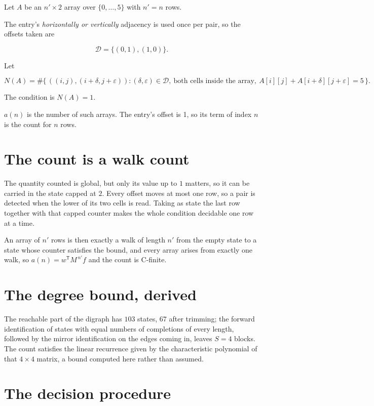 \documentclass[11pt]{article}
\theoremstyle{definition}
\begin{document}
Let $A$ be an $n' \times 2$ array over $\{0,\dots,5\}$ with $n' = n$ rows.

The entry's {\itshape horizontally or vertically} adjacency is used once per pair, so the offsets taken are

\[\mathcal{D} = \{(0,1), (1,0)\}.\]

Let

\[N(A) = \#\bigl\{\,((i,j),(i{+}\delta,j{+}\varepsilon)) : (\delta,\varepsilon) \in \mathcal{D},\ \text{both cells inside the array},\ A[i][j] + A[i{+}\delta][j{+}\varepsilon] = 5\,\bigr\}.\]

The condition is $N(A) = 1$.

$a(n)$ is the number of such arrays. The entry's offset is 1, so its term of index $n$ is the count for $n$ rows.

\section{The count is a walk count}

The quantity counted is global, but only its value up to $1$ matters, so it can be carried in the state capped at $2$. Every offset moves at most one row, so a pair is detected when the lower of its two cells is read. Taking as state the last row together with that capped counter makes the whole condition decidable one row at a time.

An array of $n'$ rows is then exactly a walk of length $n'$ from the empty state to a state whose counter satisfies the bound, and every array arises from exactly one walk, so $a(n) = w^{\mathsf T}M^{\,n'}f$ and the count is C-finite.

\section{The degree bound, derived}

The reachable part of the digraph has $103$ states, $67$ after trimming; the forward identification of states with equal numbers of completions of every length, followed by the mirror identification on the edges coming in, leaves $S = 4$ blocks. The count satisfies the linear recurrence given by the characteristic polynomial of that $4\times4$ matrix, a bound computed here rather than assumed.

\section{The decision procedure}
\end{document}
